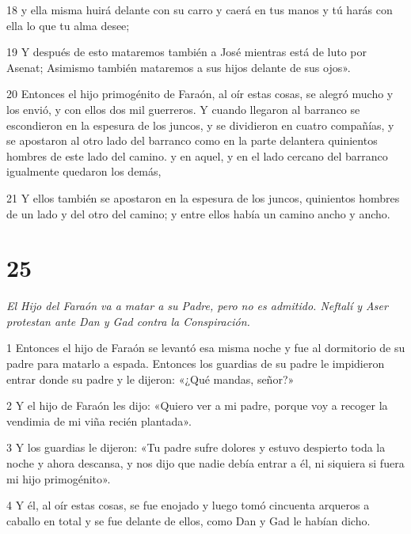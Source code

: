 \par 18 y ella misma huirá delante con su carro y caerá en tus manos y tú harás con ella lo que tu alma desee;

\par 19 Y después de esto mataremos también a José mientras está de luto por Asenat; Asimismo también mataremos a sus hijos delante de sus ojos».

\par 20 Entonces el hijo primogénito de Faraón, al oír estas cosas, se alegró mucho y los envió, y con ellos dos mil guerreros. Y cuando llegaron al barranco se escondieron en la espesura de los juncos, y se dividieron en cuatro compañías, y se apostaron al otro lado del barranco como en la parte delantera quinientos hombres de este lado del camino. y en aquel, y en el lado cercano del barranco igualmente quedaron los demás,

\par 21 Y ellos también se apostaron en la espesura de los juncos, quinientos hombres de un lado y del otro del camino; y entre ellos había un camino ancho y ancho.


\chapter{25}

\par \textit{El Hijo del Faraón va a matar a su Padre, pero no es admitido. Neftalí y Aser protestan ante Dan y Gad contra la Conspiración.}


\par 1 Entonces el hijo de Faraón se levantó esa misma noche y fue al dormitorio de su padre para matarlo a espada. Entonces los guardias de su padre le impidieron entrar donde su padre y le dijeron: «¿Qué mandas, señor?»

\par 2 Y el hijo de Faraón les dijo: «Quiero ver a mi padre, porque voy a recoger la vendimia de mi viña recién plantada».

\par 3 Y los guardias le dijeron: «Tu padre sufre dolores y estuvo despierto toda la noche y ahora descansa, y nos dijo que nadie debía entrar a él, ni siquiera si fuera mi hijo primogénito».

\par 4 Y él, al oír estas cosas, se fue enojado y luego tomó cincuenta arqueros a caballo en total y se fue delante de ellos, como Dan y Gad le habían dicho.


